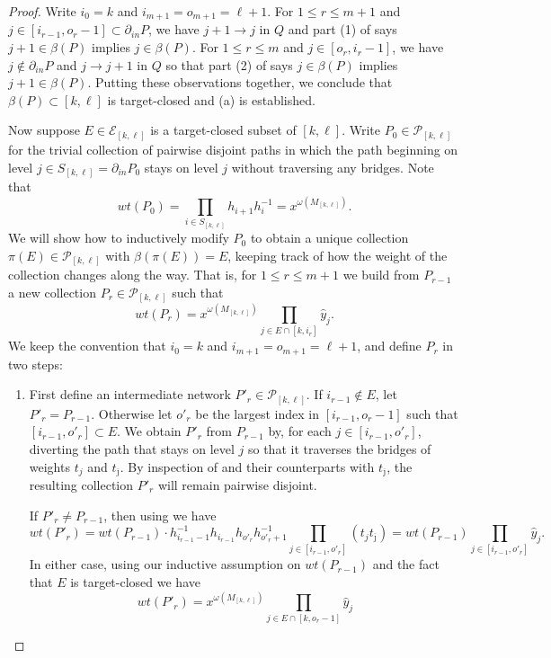 \documentclass[12pt]{amsart}
\newcommand{\gv}{\omega}
\newcommand{\grep}{\gv}
\newcommand{\cE}{\mathcal{E}}
\newcommand{\cP}{\mathcal{P}}
\newcommand{\ol}[1]{\overline{#1}}
\newcommand{\Qrep}{M}
\theoremstyle{remark}
\numberwithin{equation}{section}
\numberwithin{figure}{section}
\begin{document}
\begin{proof}
  Write $i_0=k$ and $i_{m+1}=o_{m+1}=\ell+1$.
  For $1\le r\le m+1$ and $j\in[i_{r-1},o_r-1]\subset\partial_{in}P$, we have $j+1\to j$ in $Q$ and part (1) of  says $j+1\in\beta(P)$ implies $j\in\beta(P)$.
  For $1\le r\le m$ and $j\in[o_r,i_r-1]$, we have $j\notin\partial_{in}P$ and $j\to j+1$ in $Q$ so that part (2) of  says $j\in\beta(P)$ implies $j+1\in\beta(P)$.
  Putting these observations together, we conclude that $\beta(P)\subset[k,\ell]$ is target-closed and (a) is established.
  
  Now suppose $E\in\cE_{[k,\ell]}$ is a target-closed subset of $[k,\ell]$.
  Write $P_0\in\cP_{[k,\ell]}$ for the trivial collection of pairwise disjoint paths in which the path beginning on level $j\in S_{[k,\ell]}=\partial_{in}P_0$ stays on level $j$ without traversing any bridges.
  Note that 
  \[
    wt(P_0)=\prod_{i \in S_{[k,\ell]}}h_{i+1} h_i^{-1}=x^{\grep(\Qrep_{[k,\ell]})}.
  \]  
  We will show how to inductively modify $P_0$ to obtain a unique collection $\pi(E)\in\cP_{[k,\ell]}$ with $\beta(\pi(E))=E$, keeping track of how the weight of the collection changes along the way.
  That is, for $1\le r\le m+1$ we build from $P_{r-1}$ a new collection $P_r \in \cP_{[k,\ell]}$ such that
  \[
    wt(P_r) = x^{\grep(\Qrep_{[k,\ell]})} \prod_{j \in E \cap [k,i_r]} \hat{y}_j.
  \]
  We keep the convention that $i_0=k$ and $i_{m+1}=o_{m+1}=\ell+1$, and define $P_r$ in two steps:
  \begin{enumerate}
    \item 
      First define an intermediate network $P'_r \in \cP_{[k,\ell]}$.
      If $i_{r-1} \notin E$, let $P'_r=P_{r-1}$.
      Otherwise let $o'_r$ be the largest index in $[i_{r-1},o_r-1]$ such that $[i_{r-1},o'_r]\subset E$.
      We obtain $P'_r$ from $P_{r-1}$ by, for each $j\in[i_{r-1},o'_r]$, diverting the path that stays on level $j$ so that it traverses the bridges of weights $t_j$ and $t_{\ol{\jmath}}$.
      By inspection of   and their counterparts with $t_{\ol{\jmath}}$, the resulting collection $P'_r$ will remain pairwise disjoint.
  
      If $P'_r \neq P_{r-1}$, then using  we have
      \[
        wt(P'_r)=wt(P_{r-1})\cdot h_{i_{r-1}-1}^{-1}h_{i_{r-1}}h_{o'_r}h_{o'_r+1}^{-1}\prod_{j\in[i_{r-1},o'_r]}(t_jt_{\ol{\jmath}}) = wt(P_{r-1})\prod_{j \in [i_{r-1},o'_r]} \hat{y}_j.
      \]
      In either case, using our inductive assumption on $wt(P_{r-1})$ and the fact that $E$ is target-closed we have 
      \[
        wt(P'_r) = x^{\grep(\Qrep_{[k,\ell]})} \prod_{j \in E \cap [k,o_{r}-1]} \hat{y}_j
      \]


\end{enumerate}
\end{proof}
\end{document}
